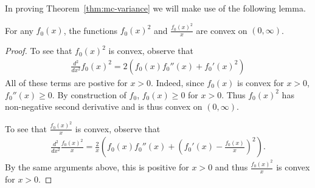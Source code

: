 
In proving Theorem~\ref{thm:mc-variance} we will make use of the following lemma.

\medskip

\begin{lemma}\label{lemma:f0-x-convex}
For any $f_0(x)$,
the functions $f_0(x)^2$ and $\frac{f_0(x)^2}{x}$ are convex on $(0, \infty)$.
\end{lemma}
\begin{proof}
To see that $f_0(x)^2$ is convex, observe that 
\begin{align*}
    \frac{d^2}{dx^2} f_0(x)^2 = 2\left( f_0(x) f_0''(x) + f_0'(x)^2 \right)
\end{align*}
All of these terms are postive for $x > 0$.
Indeed, since $f_0(x)$ is convex for $x > 0$, $f_0''(x) \geq 0$.  
By construction of $f_0$, $f_0(x) \geq 0$ for $x > 0$. 
Thus $f_0(x)^2$ has non-negative second derivative and is thus convex on $(0, \infty)$.

To see that $\frac{f_0(x)^2}{x}$ is convex, observe that
%
\begin{align*}
    \frac{d^2}{dx^2} \frac{f_0(x)^2}{x} = \frac{2}{x}\left( f_0(x) f_0''(x) + \left(f_0'(x) - \frac{f_0(x)}{x}\right)^2 \right).
\end{align*}
By the same arguments above, this is positive for $x > 0$ and thus $\frac{f_0(x)^2}{x}$ is convex for $x>0$.
\end{proof}

